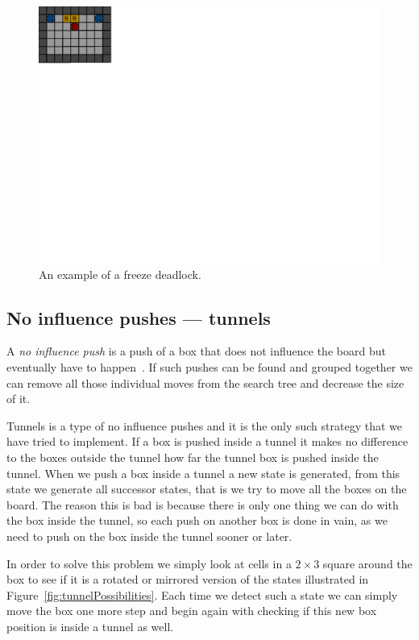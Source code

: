\documentclass[a4paper,12pt]{article}
\renewcommand{\*}[0]{\cdot}
\begin{document}
\begin{figure}[h!]
    \begin{center}
        \includegraphics{figures/freezeDeadlock}
    \end{center}
    \caption{An example of a freeze deadlock.}
    \label{fig:freezeDeadlock}
\end{figure}


\subsection{No influence pushes --- tunnels}

A \emph{no influence push} is a push of a box that does not influence the board
but eventually have to happen~\cite{sokobano:noinfluence}. If such pushes can
be found and grouped together we can remove all those individual moves from the
search tree and decrease the size of it.

Tunnels is a type of no influence pushes and it is the only such strategy that
we have tried to implement. If a box is pushed inside a tunnel it makes no
difference to the boxes outside the tunnel how far the tunnel box is pushed
inside the tunnel. When we push a box inside a tunnel a new state is generated,
from this state we generate all successor states, that is we try to move all
the boxes on the board. The reason this is bad is because there is only one
thing we can do with the box inside the tunnel, so each push on another box is
done in vain, as we need to push on the box inside the tunnel sooner or  later.

In order to solve this problem we simply look at cells in a $2 \times 3$ square
around the box to see if it is a rotated or mirrored version of the states
illustrated in Figure~\ref{fig:tunnelPossibilities}. Each time we detect such a
state we can simply move the box one more step and begin again with checking if
this new box position is inside a tunnel as well.
\end{document}
